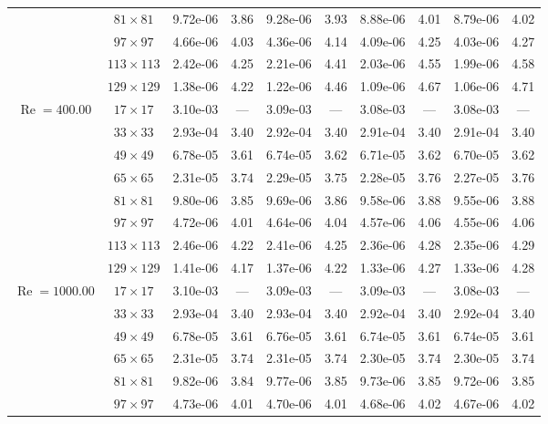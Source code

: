 \documentclass[preprint, 12pt]{elsarticle}
\begin{document}
{\begin{center}
\begin{table}[H]
{\begin{tabular*}{\textwidth}{@{\extracolsep\fill}cccccccccc@{}}
    & $81\times 81$ & 9.72e-06 & 3.86 & 9.28e-06 & 3.93 & 8.88e-06 & 4.01 & 8.79e-06 & 4.02 \\
    & $97\times 97$ & 4.66e-06 & 4.03 & 4.36e-06 & 4.14 & 4.09e-06 & 4.25 & 4.03e-06 & 4.27 \\
    & $113\times 113$ & 2.42e-06 & 4.25 & 2.21e-06 & 4.41 & 2.03e-06 & 4.55 & 1.99e-06 & 4.58 \\
    & $129\times 129$ & 1.38e-06 & 4.22 & 1.22e-06 & 4.46 & 1.09e-06 & 4.67 & 1.06e-06 & 4.71 \\
    \hline
    \multirow{7}{*}{$\operatorname{Re}=400.00$} & $17\times 17$ & 3.10e-03 & --- & 3.09e-03 & --- & 3.08e-03 & --- & 3.08e-03 & --- \\
    & $33\times 33$ & 2.93e-04 & 3.40 & 2.92e-04 & 3.40 & 2.91e-04 & 3.40 & 2.91e-04 & 3.40 \\
    & $49\times 49$ & 6.78e-05 & 3.61 & 6.74e-05 & 3.62 & 6.71e-05 & 3.62 & 6.70e-05 & 3.62 \\
    \multirow{3}{*}{$\operatorname{Wi}=5$} & $65\times 65$ & 2.31e-05 & 3.74 & 2.29e-05 & 3.75 & 2.28e-05 & 3.76 & 2.27e-05 & 3.76 \\
    & $81\times 81$ & 9.80e-06 & 3.85 & 9.69e-06 & 3.86 & 9.58e-06 & 3.88 & 9.55e-06 & 3.88 \\
    & $97\times 97$ & 4.72e-06 & 4.01 & 4.64e-06 & 4.04 & 4.57e-06 & 4.06 & 4.55e-06 & 4.06 \\
    & $113\times 113$ & 2.46e-06 & 4.22 & 2.41e-06 & 4.25 & 2.36e-06 & 4.28 & 2.35e-06 & 4.29 \\
    & $129\times 129$ & 1.41e-06 & 4.17 & 1.37e-06 & 4.22 & 1.33e-06 & 4.27 & 1.33e-06 & 4.28 \\
    \hline
    \multirow{7}{*}{$\operatorname{Re}=1000.00$} & $17\times 17$ & 3.10e-03 & --- & 3.09e-03 & --- & 3.09e-03 & --- & 3.08e-03 & --- \\
    & $33\times 33$ & 2.93e-04 & 3.40 & 2.93e-04 & 3.40 & 2.92e-04 & 3.40 & 2.92e-04 & 3.40 \\
    & $49\times 49$ & 6.78e-05 & 3.61 & 6.76e-05 & 3.61 & 6.74e-05 & 3.61 & 6.74e-05 & 3.61 \\
    \multirow{3}{*}{$\operatorname{Wi}=5$} & $65\times 65$ & 2.31e-05 & 3.74 & 2.31e-05 & 3.74 & 2.30e-05 & 3.74 & 2.30e-05 & 3.74 \\
    & $81\times 81$ & 9.82e-06 & 3.84 & 9.77e-06 & 3.85 & 9.73e-06 & 3.85 & 9.72e-06 & 3.85 \\
    & $97\times 97$ & 4.73e-06 & 4.01 & 4.70e-06 & 4.01 & 4.68e-06 & 4.02 & 4.67e-06 & 4.02 \\

\end{tabular*}}
\end{table}
\end{center}}
\end{document}

